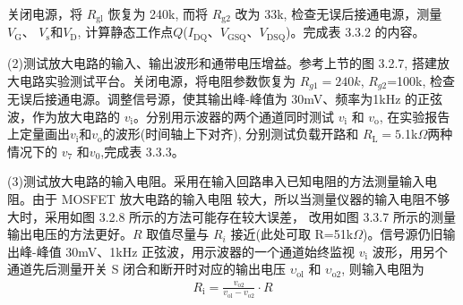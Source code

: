 \documentclass[a4paper,11pt,UTF8]{article}
\numberwithin{equation}{subsection}
\begin{document}
 关闭电源，将 $R_\mathrm{gl}$ 恢复为 240k, 而将 $R_{\mathrm{g2}}$ 改为 33k, 检查无误后接通电源，测量 $V_{\mathrm{G}}$、 $V_\mathrm{s}$和$V_\mathrm{D}$, 计算静态工作点$Q$($I_\mathrm{DQ}$、$V_\mathrm{GSQ}$、$V_\mathrm{DSQ}$)。完成表 3.3.2 的内容。
\begin{table}[h]
	\centering
\caption{静态工作点}
\end{table}
(2)测试放大电路的输入、输出波形和通带电压增益。参考上节的图 3.2.7, 搭建放大电路实验测试平台。关闭电源，将电阻参数恢复为
$R_{g1}=240k$, $R_{g2}$=100k, 检查无误后接通电源。调整信号源，使其输出峰-峰值为 30mV、频率为1kHz 的正弦波，作为放大电路的 $v_\mathrm{i}$。分别用示波器的两个通道同时测试 $v_\mathrm{i}$ 和 $v_\mathrm{o}$, 在实验报告上定量画出$v_\mathrm{i}$和$v_\mathrm{o}$的波形(时间轴上下对齐), 分别测试负载开路和 $R_\mathrm{L}=5$.1k$\Omega$两种情况下的 $v_{7}$ 和$v_{0}$,完成表 3.3.3。

(3)测试放大电路的输入电阻。采用在输入回路串入已知电阻的方法测量输入电阻。由于 MOSFET 放大电路的输入电阻
较大，所以当测量仪器的输入电阻不够大时，采用如图 3.2.8 所示的方法可能存在较大误差， 改用如图 3.3.7 所示的测量输出电压的方法更好。$R$ 取值尽量与 $R_i$ 接近(此处可取 R=51k$\Omega$)。信号源仍旧输出峰-峰值 30mV、1kHz 正弦波，用示波器的一个通道始终监视 $v_\mathrm{i}$ 波形，用另个通道先后测量开关 S 闭合和断开时对应的输出电压 $\upsilon_\mathrm{ol}$ 和 $\upsilon_\mathrm{o2}$, 则输入电阻为
\begin{align}R_{\mathrm{i}}=\frac{v_{\mathrm{o}2}}{v_{\mathrm{ol}}-v_{\mathrm{o}2}}\cdot R\end{align}
\end{document}
